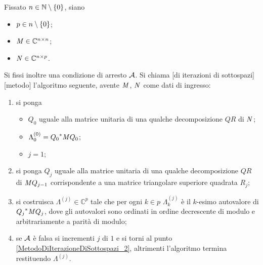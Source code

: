 \begin{Definition}
  Fissato $n \in \mathbb{N} \setminus \lbrace 0 \rbrace$, siano
  \begin{itemize}
    \item $p \in n \setminus \lbrace 0 \rbrace$;
    \item $\mathit{M} \in \mathbb{C}^{n \times n}$;
    \item $\mathit{N} \in \mathbb{C}^{n \times p}$.
  \end{itemize}
  Si fissi inoltre una condizione di arresto $\mathcal{A}$.
  Si chiama
  [di iterazioni di sottospazi][metodo]
  l'algoritmo seguente, avente $\mathit{M}$, $\mathit{N}$
  come dati di ingresso:
  \begin{enumerate}
    \item\label{MetodoDiIterazioneDiSottospazi_1} si ponga
      \begin{itemize}
        \item $Q_0$ uguale alla matrice unitaria di una qualche
              decomposizione $QR$ di $\mathit{N}$;
        \item $\Lambda_0^{(0)} =
                {Q_0}^*\mathit{M} Q_{0}$;
        \item $j = 1$;
      \end{itemize}
    \item\label{MetodoDiIterazioneDiSottospazi_2} si ponga
      $Q_j$ uguale alla matrice unitaria di una qualche
      decomposizione $QR$ di $\mathit{M} Q_{j - 1}$ corrispondente
      a una matrice triangolare superiore quadrata $R_j$;
    \item\label{MetodoDiIterazioneDiSottospazi_3} si costruisca
      $\Lambda^{(j)} \in \mathbb{C}^p$ tale che per ogni $k \in p$
      $\Lambda^{(j)}_k$ \`e il $k$-esimo autovalore di
      ${Q_j}^*\mathit{M} Q_{j}$, dove
      gli autovalori sono ordinati in ordine decrescente di modulo e arbitrariamente
      a parit\`a di modulo;
    \item\label{MetodoDiIterazioneDiSottospazi_5} se
      $\mathcal{A}$ \`e falsa
      si incrementi $j$ di $1$ e si torni al punto
      \ref{MetodoDiIterazioneDiSottospazi_2}, altrimenti l'algoritmo termina
      restituendo $\Lambda^{(j)}$.
  \end{enumerate}
\end{Definition}
\begin{listing}
	\caption{Implementazione del metodo di iterazioni di sottospazi in
    .}
\end{listing}
